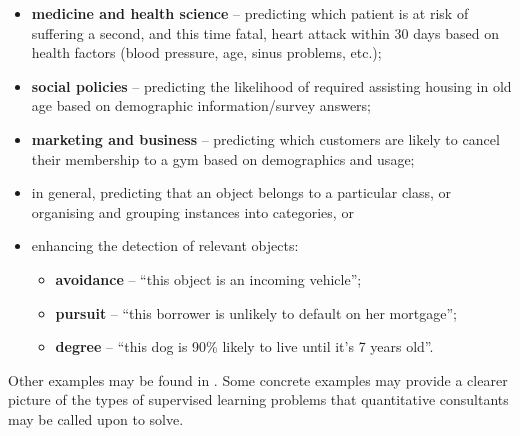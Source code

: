 \begin{itemize}[noitemsep]
\item \textbf{medicine and health science} -- predicting which patient is at risk of suffering a second, and this time fatal, heart attack within 30 days based on health factors (blood pressure, age, sinus problems, etc.);
\item \textbf{social policies} -- predicting the likelihood of required assisting housing in old age based on demographic information/survey answers;
\item \textbf{marketing and business} -- predicting which customers are likely to cancel their membership to a gym based on demographics and usage; 
\item in general, predicting that an object belongs to a particular class, or organising and grouping instances into categories, or 
\item enhancing the detection of relevant objects: 
\begin{itemize}[noitemsep,topsep=2pt]
\item \textbf{avoidance} -- ``this object is an incoming vehicle''; \item \textbf{pursuit} -- ``this borrower is unlikely to default on her mortgage''; \item \textbf{degree} -- ``this dog is 90\% likely to live until it's 7 years old''. 
\end{itemize}
\end{itemize}
Other examples may be found in \cite{DSML_CS1,DSML_CS2,DSML_CS3,DSML_CS4}. 
\newpage\noindent 
Some concrete examples may provide a clearer picture of the types of supervised learning problems that quantitative consultants may be called upon to solve.  
